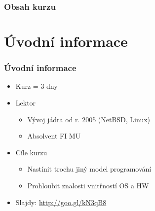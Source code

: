 


\usepackage{pifont}
\newcommand{\cmark}{\ding{51}}
\newcommand{\xmark}{\ding{55}}

\date{12--14. 12. \the\year}



\frame{\titlepage}


\begin{frame}
  \frametitle{Obsah kurzu}
  \tableofcontents
\end{frame}

\section{Úvodní informace}
\frame{\sectionpage}

\begin{frame}
  \frametitle{Úvodní informace}
  \begin{itemize}
    \item Kurz = 3 dny

    \pause

    \item Lektor
    \begin{itemize}
      \item Vývoj jádra od r. 2005 (NetBSD, Linux)
      \item Absolvent FI MU
    \end{itemize}

    \pause

    \item Cíle kurzu
    \begin{itemize}
      \item Nastínit trochu jiný model programování
      \item Prohloubit znalosti vnitřností OS a HW
    \end{itemize}

    \pause

    \item Slajdy: \url{http://goo.gl/kN3qB8}

  \end{itemize}

\end{frame}




